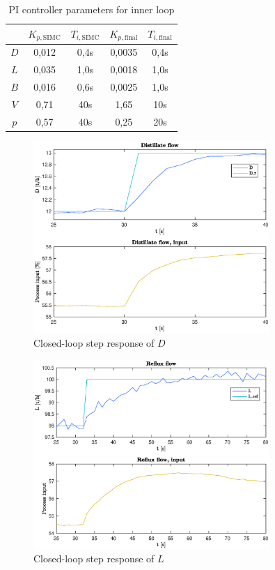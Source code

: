 \documentclass[12pt]{article}
\begin{document}
\begin{table}
\centering
\begin{tabular}{c | c | c : c | c}
& $K_{p, \textrm{SIMC}}$ & $T_{i, \textrm{SIMC}}$ & $K_{p, \textrm{final}}$ & $T_{i, \textrm{final}}$ \\ \hline
$D$ & 0,012 & 0,4s & 0,0035 & 0,4s\\
$L$ &  0,035 & 1,0s & 0,0018 & 1,0s \\
$B$ & 0,016 & 0,6s & 0,0025 & 1,0s \\
$V$ & 0,71 & 40s & 1,65 & 10s \\
$p$ & 0,57 & 40s & 0,25 & 20s
\end{tabular}
\caption{PI controller parameters for inner loop}
\label{tab:inner_loop_PI_parameters}
\end{table}

\begin{figure}[p]
\centering
\includegraphics[width=0.8\textwidth]{../Systemanalyse/Log_Data_to_Matlab/Figurer/Stegeksperimenter/FC1005_step.eps}
\caption{Closed-loop step response of $D$}
\label{fig:cl_step_FC1005}
\end{figure}

\begin{figure}[p]
\centering
\includegraphics[width=0.8\textwidth]{../Systemanalyse/Log_Data_to_Matlab/Figurer/Stegeksperimenter/FC1015_step.eps}
\caption{Closed-loop step response of $L$}
\label{fig:cl_step_FC1015}
\end{figure}
\end{document}
